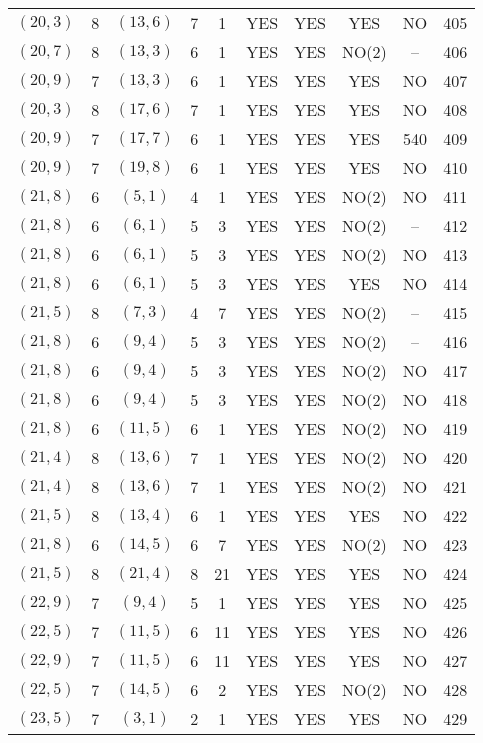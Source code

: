 \begin{longtable}{|c|c|c|c|c|c|c|c|c|c|}
$(20, 3)$ & 8 & $(13, 6)$ & 7 & 1 & YES & YES & YES & NO & 405\\
$(20, 7)$ & 8 & $(13, 3)$ & 6 & 1 & YES & YES & NO(2) & -- & 406\\
$(20, 9)$ & 7 & $(13, 3)$ & 6 & 1 & YES & YES & YES & NO & 407\\
$(20, 3)$ & 8 & $(17, 6)$ & 7 & 1 & YES & YES & YES & NO & 408\\
$(20, 9)$ & 7 & $(17, 7)$ & 6 & 1 & YES & YES & YES & 540 & 409\\
$(20, 9)$ & 7 & $(19, 8)$ & 6 & 1 & YES & YES & YES & NO & 410\\
$(21, 8)$ & 6 & $(5, 1)$ & 4 & 1 & YES & YES & NO(2) & NO & 411\\
$(21, 8)$ & 6 & $(6, 1)$ & 5 & 3 & YES & YES & NO(2) & -- & 412\\
$(21, 8)$ & 6 & $(6, 1)$ & 5 & 3 & YES & YES & NO(2) & NO & 413\\
$(21, 8)$ & 6 & $(6, 1)$ & 5 & 3 & YES & YES & YES & NO & 414\\
$(21, 5)$ & 8 & $(7, 3)$ & 4 & 7 & YES & YES & NO(2) & -- & 415\\
$(21, 8)$ & 6 & $(9, 4)$ & 5 & 3 & YES & YES & NO(2) & -- & 416\\
$(21, 8)$ & 6 & $(9, 4)$ & 5 & 3 & YES & YES & NO(2) & NO & 417\\
$(21, 8)$ & 6 & $(9, 4)$ & 5 & 3 & YES & YES & NO(2) & NO & 418\\
$(21, 8)$ & 6 & $(11, 5)$ & 6 & 1 & YES & YES & NO(2) & NO & 419\\
$(21, 4)$ & 8 & $(13, 6)$ & 7 & 1 & YES & YES & NO(2) & NO & 420\\
$(21, 4)$ & 8 & $(13, 6)$ & 7 & 1 & YES & YES & NO(2) & NO & 421\\
$(21, 5)$ & 8 & $(13, 4)$ & 6 & 1 & YES & YES & YES & NO & 422\\
$(21, 8)$ & 6 & $(14, 5)$ & 6 & 7 & YES & YES & NO(2) & NO & 423\\
$(21, 5)$ & 8 & $(21, 4)$ & 8 & 21 & YES & YES & YES & NO & 424\\
$(22, 9)$ & 7 & $(9, 4)$ & 5 & 1 & YES & YES & YES & NO & 425\\
$(22, 5)$ & 7 & $(11, 5)$ & 6 & 11 & YES & YES & YES & NO & 426\\
$(22, 9)$ & 7 & $(11, 5)$ & 6 & 11 & YES & YES & YES & NO & 427\\
$(22, 5)$ & 7 & $(14, 5)$ & 6 & 2 & YES & YES & NO(2) & NO & 428\\
$(23, 5)$ & 7 & $(3, 1)$ & 2 & 1 & YES & YES & YES & NO & 429\\

\end{longtable}
